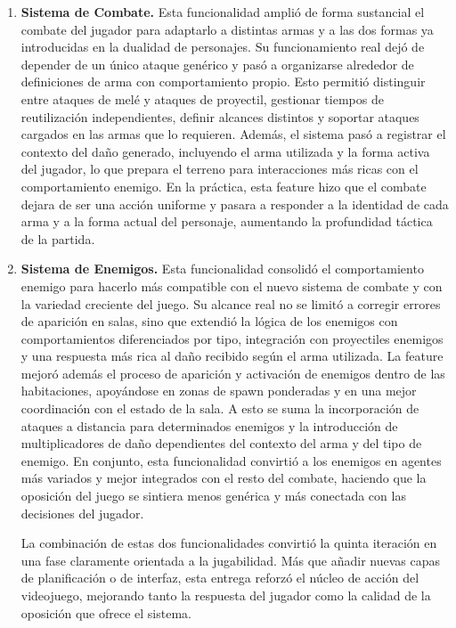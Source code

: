 \begin{enumerate}
\item \textbf{Sistema de Combate.} Esta funcionalidad amplió de forma sustancial el combate
del jugador para adaptarlo a distintas armas y a las dos formas ya introducidas en la
dualidad de personajes. Su funcionamiento real dejó de depender de un único ataque
genérico y pasó a organizarse alrededor de definiciones de arma con comportamiento propio.
Esto permitió distinguir entre ataques de melé y ataques de proyectil, gestionar tiempos de
reutilización independientes, definir alcances distintos y soportar ataques cargados en las
armas que lo requieren. Además, el sistema pasó a registrar el contexto del daño generado,
incluyendo el arma utilizada y la forma activa del jugador, lo que prepara el terreno para
interacciones más ricas con el comportamiento enemigo. En la práctica, esta feature hizo que
el combate dejara de ser una acción uniforme y pasara a responder a la identidad de cada
arma y a la forma actual del personaje, aumentando la profundidad táctica de la partida.

\item \textbf{Sistema de Enemigos.} Esta funcionalidad consolidó el comportamiento enemigo
para hacerlo más compatible con el nuevo sistema de combate y con la variedad creciente del
juego. Su alcance real no se limitó a corregir errores de aparición en salas, sino que
extendió la lógica de los enemigos con comportamientos diferenciados por tipo, integración
con proyectiles enemigos y una respuesta más rica al daño recibido según el arma utilizada.
La feature mejoró además el proceso de aparición y activación de enemigos dentro de las
habitaciones, apoyándose en zonas de spawn ponderadas y en una mejor coordinación con el
estado de la sala. A esto se suma la incorporación de ataques a distancia para determinados
enemigos y la introducción de multiplicadores de daño dependientes del contexto del arma y
del tipo de enemigo. En conjunto, esta funcionalidad convirtió a los enemigos en agentes
más variados y mejor integrados con el resto del combate, haciendo que la oposición del
juego se sintiera menos genérica y más conectada con las decisiones del jugador.

La combinación de estas dos funcionalidades convirtió la quinta iteración en una fase
claramente orientada a la jugabilidad. Más que añadir nuevas capas de planificación o de
interfaz, esta entrega reforzó el núcleo de acción del videojuego, mejorando tanto la
respuesta del jugador como la calidad de la oposición que ofrece el sistema.

\end{enumerate}

